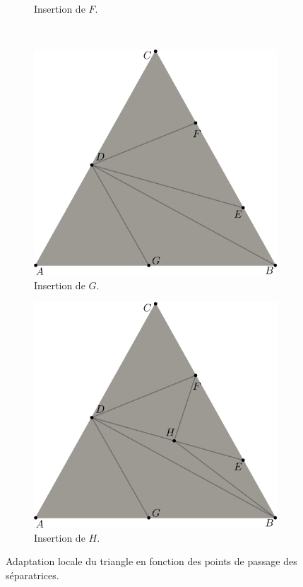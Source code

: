 \begin{figure}[h!]
\begin{subfigure}{0.45\textwidth}
    \caption{Insertion de $F$.}
    \label{fig:exemple_insert_pt_3}
\end{subfigure}
\\[0.1cm]
\begin{subfigure}{0.45\textwidth}
    \includegraphics[width=\textwidth]{images/decoup_triangle-4.pdf}
    \caption{Insertion de $G$.}
    \label{fig:exemple_insert_pt_4}
\end{subfigure}
\hfill
\begin{subfigure}{0.45\textwidth}
    \includegraphics[width=\textwidth]{images/decoup_triangle-5.pdf}
    \caption{Insertion de $H$.}
    \label{fig:exemple_insert_pt_5}
\end{subfigure}
\caption{Adaptation locale du triangle en fonction des points de passage des séparatrices.}
\label{fig:exemple_insert_pt}
\end{figure}


